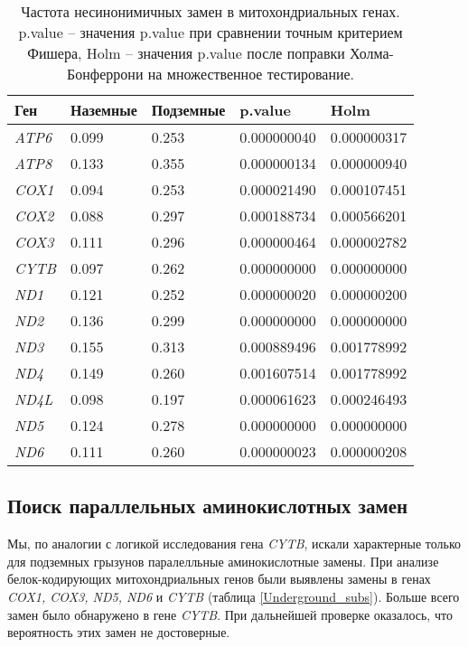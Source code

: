 \begin{table}[h!]
		\caption{Частота несинонимичных замен в митохондриальных генах. p.value -- значения p.value при сравнении точным критерием Фишера, Holm -- значения p.value после поправки Холма-Бонферрони на множественное тестирование.}\label{ns_by_genes}
	\vspace{5mm}
	\begin{tabular}{|l|l|l|l|l|}
		\hline
		\textbf{Ген} & \textbf{Наземные} & \textbf{Подземные} & \textbf{p.value} & \textbf{Holm} \\ \hline
		\textit{ATP6} & 0.099 & 0.253 & 0.000000040 & 0.000000317 \\ \hline
		\textit{ATP8} & 0.133 & 0.355 & 0.000000134 & 0.000000940 \\ \hline
		\textit{COX1} & 0.094 & 0.253 & 0.000021490 & 0.000107451 \\ \hline
		\textit{COX2} & 0.088 & 0.297 & 0.000188734 & 0.000566201 \\ \hline
		\textit{COX3} & 0.111 & 0.296 & 0.000000464 & 0.000002782 \\ \hline
		\textit{CYTB} & 0.097 & 0.262 & 0.000000000 & 0.000000000 \\ \hline
		\textit{ND1} & 0.121 & 0.252 & 0.000000020 & 0.000000200 \\ \hline
		\textit{ND2} & 0.136 & 0.299 & 0.000000000 & 0.000000000 \\ \hline
		\textit{ND3} & 0.155 & 0.313 & 0.000889496 & 0.001778992 \\ \hline
		\textit{ND4} & 0.149 & 0.260 & 0.001607514 & 0.001778992 \\ \hline
		\textit{ND4L} & 0.098 & 0.197 & 0.000061623 & 0.000246493 \\ \hline
		\textit{ND5} & 0.124 & 0.278 & 0.000000000 & 0.000000000 \\ \hline
		\textit{ND6} & 0.111 & 0.260 & 0.000000023 & 0.000000208 \\ \hline
	\end{tabular}
\end{table}


\subsection{Поиск параллельных аминокислотных замен}

Мы, по аналогии с логикой исследования гена \textit{CYTB}, искали характерные только для подземных грызунов паралелльные аминокислотные замены. При анализе белок-кодирующих митохондриальных генов были выявлены замены в генах \textit{COX1, COX3, ND5, ND6} и \textit{CYTB} (таблица \ref{Underground_subs}). Больше всего замен было обнаружено в гене \textit{CYTB}. При дальнейшей проверке оказалось, что вероятность этих замен не достоверные.

